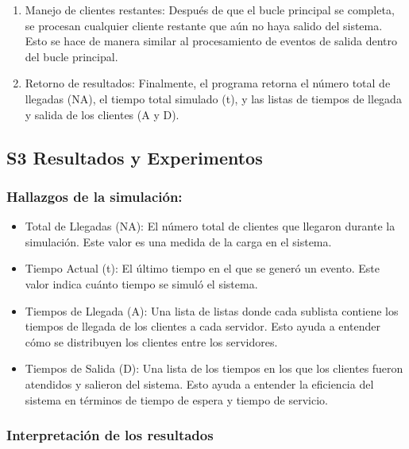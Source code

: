 \documentclass[
]{article}
\providecommand{\tightlist}{%
  \setlength{\itemsep}{0pt}\setlength{\parskip}{0pt}}
\begin{document}
\begin{enumerate}
\def\labelenumi{\arabic{enumi}.}
\setcounter{enumi}{3}
\tightlist
\item
  Manejo de clientes restantes: Después de que el bucle principal se
  completa, se procesan cualquier cliente restante que aún no haya
  salido del sistema. Esto se hace de manera similar al procesamiento de
  eventos de salida dentro del bucle principal.
\item
  Retorno de resultados: Finalmente, el programa retorna el número total
  de llegadas (NA), el tiempo total simulado (t), y las listas de
  tiempos de llegada y salida de los clientes (A y D).
\end{enumerate}

\hypertarget{s3-resultados-y-experimentos}{%
\subsection{S3 Resultados y
Experimentos}\label{s3-resultados-y-experimentos}}

\hypertarget{hallazgos-de-la-simulaciuxf3n}{%
\subsubsection{Hallazgos de la
simulación:}\label{hallazgos-de-la-simulaciuxf3n}}

\begin{itemize}
\item
  Total de Llegadas (NA): El número total de clientes que llegaron
  durante la simulación. Este valor es una medida de la carga en el
  sistema.
\item
  Tiempo Actual (t): El último tiempo en el que se generó un evento.
  Este valor indica cuánto tiempo se simuló el sistema.
\item
  Tiempos de Llegada (A): Una lista de listas donde cada sublista
  contiene los tiempos de llegada de los clientes a cada servidor. Esto
  ayuda a entender cómo se distribuyen los clientes entre los
  servidores.
\item
  Tiempos de Salida (D): Una lista de los tiempos en los que los
  clientes fueron atendidos y salieron del sistema. Esto ayuda a
  entender la eficiencia del sistema en términos de tiempo de espera y
  tiempo de servicio.
\end{itemize}

\hypertarget{interpretaciuxf3n-de-los-resultados}{%
\subsubsection{Interpretación de los
resultados}\label{interpretaciuxf3n-de-los-resultados}}
\end{document}
